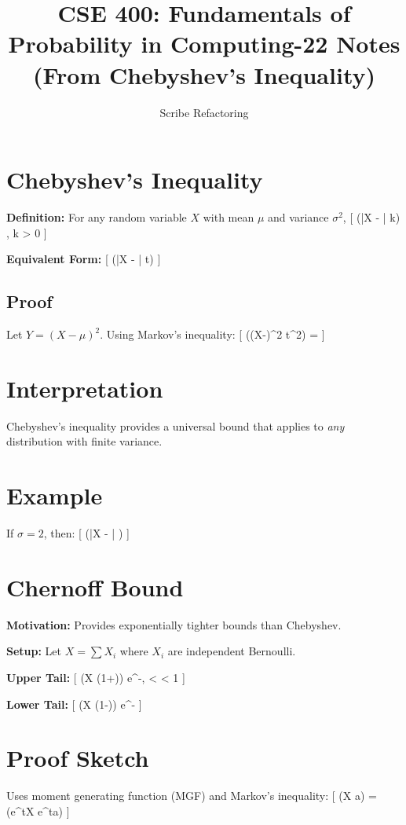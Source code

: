 \documentclass[11pt]{article}
\title{CSE 400: Fundamentals of Probability in Computing\Lecture 21-22 Notes (From Chebyshev's Inequality)}
\author{Scribe Refactoring}
\date{}
\begin{document}
\maketitle

\section{Chebyshev's Inequality}

\textbf{Definition:} For any random variable $X$ with mean $\mu$ and variance $\sigma^2$,
[
\Pr(|X - \mu| \geq k\sigma) \leq {}, \quad k > 0
]

\textbf{Equivalent Form:}
[
\Pr(|X - \mu| \geq t) \leq {}
]

\subsection{Proof}
Let $Y = (X - \mu)^2$. Using Markov's inequality:
[
\Pr((X-\mu)^2 \geq t^2) \leq {} = 
]

\section{Interpretation}
Chebyshev's inequality provides a universal bound that applies to \textit{any} distribution with finite variance.

\section{Example}
If $\sigma = 2$, then:
[
\Pr(|X - \mu| ) \leq {}
]

\section{Chernoff Bound}

\textbf{Motivation:} Provides exponentially tighter bounds than Chebyshev.

\textbf{Setup:} Let $X = \sum X_i$ where $X_i$ are independent Bernoulli.

\textbf{Upper Tail:}
[
\Pr(X \geq (1+\delta)\mu) \leq e^{-},  < \delta < 1
]

\textbf{Lower Tail:}
[
\Pr(X \leq (1-\delta)\mu) \leq e^{-}
]

\section{Proof Sketch}
Uses moment generating function (MGF) and Markov's inequality:
[
\Pr(X \geq a) = \Pr(e^{tX} \geq e^{ta}) \leq {}
]
\end{document}
